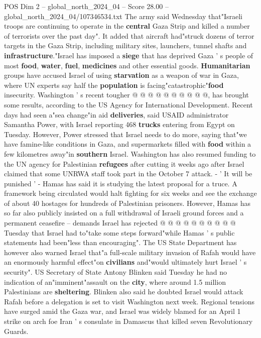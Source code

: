 \begin{textsample}{POS Dim 2 – global\_north\_2024\_04 – Score 28.00 – global\_north\_2024\_04/107346534.txt}
The army said Wednesday that"Israeli troops are continuing to operate in the \textbf{central} Gaza Strip and killed a number of terrorists over the past day".
It added that aircraft had"struck dozens of terror targets in the Gaza Strip, including military sites, launchers, tunnel shafts and \textbf{infrastructure}."Israel has imposed a \textbf{siege} that has deprived Gaza ' s people of most \textbf{food}, \textbf{water}, \textbf{fuel}, \textbf{medicines} and other essential goods. \textbf{Humanitarian} groups have accused Israel of using \textbf{starvation} as a weapon of war in Gaza, where UN experts say half the \textbf{population} is facing"catastrophic"\textbf{food} insecurity.
Washington ' s recent tougher @ @ @ @ @ @ @ @ @ @, has brought some results, according to the US Agency for International Development.
Recent days had seen a"sea change"in aid \textbf{deliveries}, said USAID administrator Samantha Power, with Israel reporting 468 \textbf{trucks} entering from Egypt on Tuesday.
However, Power stressed that Israel needs to do more, saying that"we have famine-like conditions in Gaza, and supermarkets filled with \textbf{food} within a few kilometres away"in \textbf{southern} Israel.
Washington has also resumed funding to the UN agency for Palestinian \textbf{refugees} after cutting it weeks ago after Israel claimed that some UNRWA staff took part in the October 7 attack. - ' It will be punished ' - Hamas has said it is studying the latest proposal for a truce.
A framework being circulated would halt fighting for six weeks and see the exchange of about 40 hostages for hundreds of Palestinian prisoners.
However, Hamas has so far also publicly insisted on a full withdrawal of Israeli ground forces and a permanent ceasefire -- demands Israel has rejected @ @ @ @ @ @ @ @ @ @ Tuesday that Israel had to"take some steps forward"while Hamas ' s public statements had been"less than encouraging".
The US State Department has however also warned Israel that"a full-scale military invasion of Rafah would have an enormously harmful effect"on \textbf{civilians} and"would ultimately hurt Israel ' s security".
US Secretary of State Antony Blinken said Tuesday he had no indication of an"imminent"assault on the \textbf{city}, where around 1.5 million Palestinians are \textbf{sheltering}.
Blinken also said he doubted Israel would attack Rafah before a delegation is set to visit Washington next week.
Regional tensions have surged amid the Gaza war, and Israel was widely blamed for an April 1 strike on arch foe Iran ' s consulate in Damascus that killed seven Revolutionary Guards.

\end{textsample}
